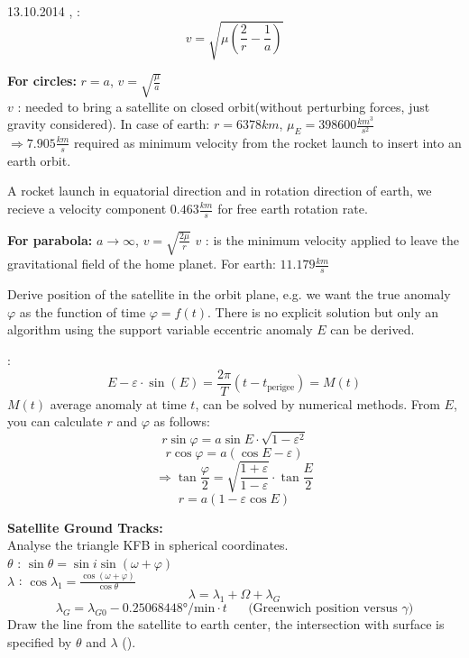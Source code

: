 \begin{chapter}{13.10.2014}
 , :
 \[ v = \sqrt{\mu \left( \frac{2}{r} - \frac{1}{a} \right)} \]

 \textbf{For circles:} $r=a$, $v=\sqrt{\frac{\mu}{a}}$\\
 $v$ : needed to bring a satellite on closed orbit(without perturbing forces, just gravity considered). In case of earth: $r = 6378km$, $\mu_E = 398600 \frac{km^3}{s^2}$\\
 $\Rightarrow 7.905 \frac{km}{s}$ required as minimum velocity from the rocket launch to insert into an earth orbit.
 
 A rocket launch in equatorial direction and in rotation direction of earth, we recieve a velocity component $0.463 \frac{km}{s}$ for free earth rotation rate.
 
 \textbf{For parabola:} $a\rightarrow \infty$, $v = \sqrt{\frac{2\mu}{r}}$
 $v$ : is the minimum velocity applied to leave the gravitational field of the home planet. For earth: $11.179 \frac{km}{s}$

 Derive position of the satellite in the orbit plane, e.g. we want the true anomaly $\varphi$ as the function of time $\varphi = f(t)$. There is no explicit solution but only an algorithm using the support variable eccentric anomaly $E$ can be derived.
 
 \textbf{}:
 \[ E - \varepsilon\cdot\sin(E) = \frac{2\pi}{T}(t-t_\text{perigee}) =M(t) \]
 $M(t)$ average anomaly at time $t$, can be solved by numerical methods. From $E$, you can calculate $r$ and $\varphi$ as follows:\\
 \[r\sin\varphi = a\sin E \cdot \sqrt{1-\varepsilon^2}\]
 \[r\cos\varphi = a(\cos E - \varepsilon)\]
 \[\Rightarrow \tan \frac{\varphi}{2} = \sqrt{\frac{1+\varepsilon}{1-\varepsilon}}\cdot \tan\frac{E}{2}\]
 \[r=a(1-\varepsilon\cos E)\]
 
 \textbf{Satellite Ground Tracks:}\\
 Analyse the triangle KFB in spherical coordinates.\\
 $\theta$ : $\sin \theta = \sin i \sin (\omega + \varphi)$\\
 $\lambda$ : $\cos \lambda_1 = \frac{\cos(\omega + \varphi)}{\cos \theta}$
 \[ \lambda = \lambda_1 + \Omega + \lambda_G \]
 \[ \lambda_G = \lambda_{G0} - 0.25068448° /\text{min} \cdot t \text{~~~~~(Greenwich position versus $\gamma$)}\]
 Draw the line from the satellite to earth center, the intersection with surface is specified by $\theta$ and $\lambda$ ().
 

\end{chapter}

